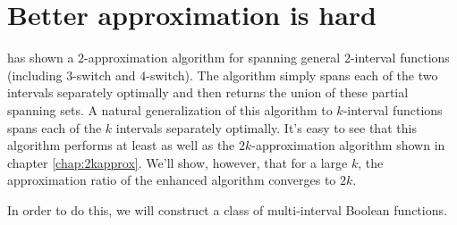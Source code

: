 \chapter{Better approximation is hard}

\dubovsky{} has shown a $2$-approximation algorithm
for spanning general $2$-interval functions
(including $3$-switch and $4$-switch).\cite[p.~33]{Dubovsky2012}
The algorithm simply spans each of the two intervals
separately optimally and then returns the union
of these partial spanning sets.
A natural generalization of this algorithm to $k$-interval
functions spans each of the $k$ intervals separately
optimally.
It's easy to see that this algorithm performs
at least as well as the $2k$-approximation algorithm
shown in chapter \ref{chap:2kapprox}.
We'll show, however,
that for a large $k$,
the approximation ratio of the enhanced algorithm
converges to $2k$.

In order to do this,
we will construct a class of  multi-interval
Boolean functions.

